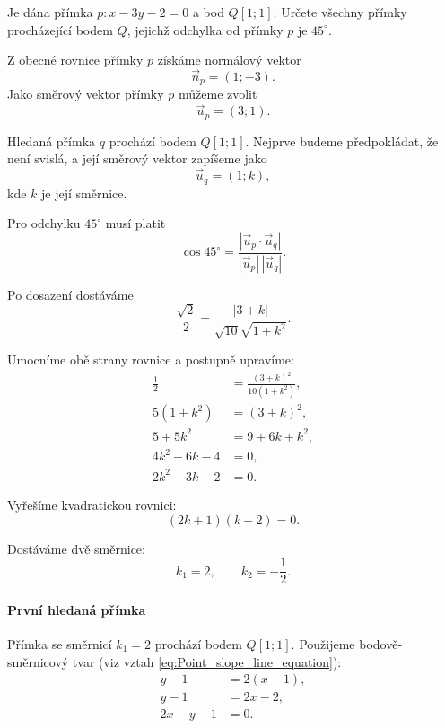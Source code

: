 \begin{example}\label{exa:Lines_through_point_given_angle}
    Je dána přímka $p:x-3y-2=0$ a bod $Q[1;1]$. Určete všechny
    přímky procházející bodem $Q$, jejichž odchylka od přímky $p$
    je $45^\circ$.

    Z obecné rovnice přímky $p$ získáme normálový vektor
    \[
        \vec{n}_p=(1;-3).
    \]
    Jako směrový vektor přímky $p$ můžeme zvolit
    \[
        \vec{u}_p=(3;1).
    \]

    Hledaná přímka $q$ prochází bodem $Q[1;1]$. Nejprve budeme
    předpokládat, že není svislá, a její směrový vektor zapíšeme jako
    \[
        \vec{u}_q=(1;k),
    \]
    kde $k$ je její směrnice.

    Pro odchylku $45^\circ$ musí platit
    \[
        \cos45^\circ
        =
        \frac{
            |\vec{u}_p\cdot\vec{u}_q|
        }
        {
            |\vec{u}_p|\,|\vec{u}_q|
        }.
    \]

    Po dosazení dostáváme
    \[
        \frac{\sqrt2}{2}
        =
        \frac{|3+k|}
        {\sqrt{10}\sqrt{1+k^2}}.
    \]

    Umocníme obě strany rovnice a postupně upravíme:
    \begin{align*}
        \frac12
        &=
        \frac{(3+k)^2}{10(1+k^2)},\\
        5(1+k^2)
        &=
        (3+k)^2,\\
        5+5k^2
        &=
        9+6k+k^2,\\
        4k^2-6k-4
        &=
        0,\\
        2k^2-3k-2
        &=
        0.
    \end{align*}

    Vyřešíme kvadratickou rovnici:
    \[
        (2k+1)(k-2)=0.
    \]

    Dostáváme dvě směrnice:
    \[
        k_1=2,
        \qquad
        k_2=-\frac12.
    \]

    \paragraph{První hledaná přímka}

    Přímka se směrnicí $k_1=2$ prochází bodem $Q[1;1]$. Použijeme
    bodově-směrnicový tvar (viz vztah \eqref{eq:Point_slope_line_equation}):
    \begin{align*}
        y-1&=2(x-1),\\
        y-1&=2x-2,\\
        2x-y-1&=0.
    \end{align*}


\end{example}
